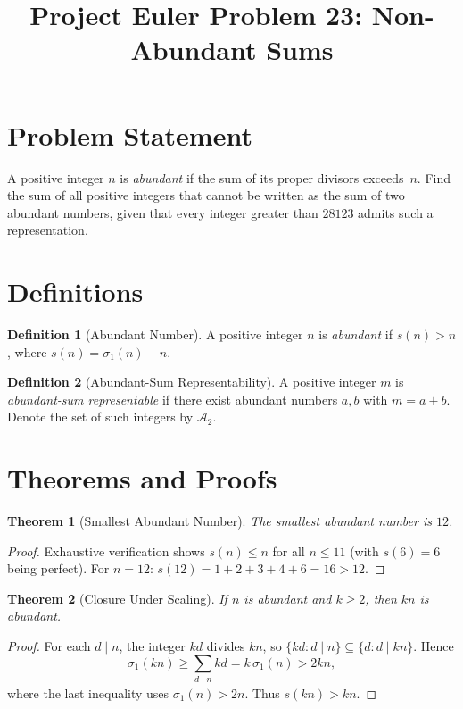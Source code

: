 \documentclass[12pt,a4paper]{article}
\title{Project Euler Problem 23: Non-Abundant Sums}
\author{}
\date{}
\newtheorem{theorem}{Theorem}
\theoremstyle{definition}
\newtheorem{definition}{Definition}
\theoremstyle{remark}
\begin{document}
\maketitle

\section{Problem Statement}

A positive integer $n$ is \emph{abundant} if the sum of its proper divisors exceeds~$n$. Find the sum of all positive integers that cannot be written as the sum of two abundant numbers, given that every integer greater than $28123$ admits such a representation.

\section{Definitions}

\begin{definition}[Abundant Number]
A positive integer $n$ is \emph{abundant} if $s(n) > n$, where $s(n) = \sigma_1(n) - n$.
\end{definition}

\begin{definition}[Abundant-Sum Representability]
A positive integer $m$ is \emph{abundant-sum representable} if there exist abundant numbers $a, b$ with $m = a + b$. Denote the set of such integers by $\mathcal{A}_2$.
\end{definition}

\section{Theorems and Proofs}

\begin{theorem}[Smallest Abundant Number]
The smallest abundant number is $12$.
\end{theorem}

\begin{proof}
Exhaustive verification shows $s(n) \leq n$ for all $n \leq 11$ (with $s(6) = 6$ being perfect). For $n = 12$: $s(12) = 1 + 2 + 3 + 4 + 6 = 16 > 12$.
\end{proof}

\begin{theorem}[Closure Under Scaling]
If $n$ is abundant and $k \geq 2$, then $kn$ is abundant.
\end{theorem}

\begin{proof}
For each $d \mid n$, the integer $kd$ divides $kn$, so $\{kd : d \mid n\} \subseteq \{d : d \mid kn\}$. Hence
\[
\sigma_1(kn) \geq \sum_{d \mid n} kd = k\,\sigma_1(n) > 2kn,
\]
where the last inequality uses $\sigma_1(n) > 2n$. Thus $s(kn) > kn$.
\end{proof}
\end{document}
